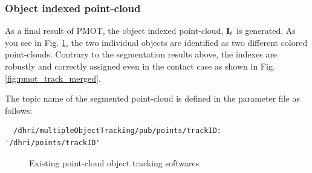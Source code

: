 \documentclass[a4paper,twoside, openright,12pt]{report}
\begin{document}
\subsubsection{Object indexed point-cloud}
As a final result of PMOT, the object indexed point-cloud, ${\bf{I}}_t$ is generated. As you see in Fig. \ref{fig:pmot_track}, the two individual objects are identified as two different colored point-clouds. Contrary to the segmentation results above, the indexes are robustly and correctly assigned even in the contact case as shown in Fig. \ref{fig:pmot_track_merged}.

The topic name of the segmented point-cloud is defined in the parameter file as follows: 
\begin{verbatim}
  /dhri/multipleObjectTracking/pub/points/trackID: '/dhri/points/trackID'
\end{verbatim}

\begin{figure}[t]
	\centering
	\hfil
	\caption{Existing point-cloud object tracking softwares}
	\label{fig:pmot_track}
\end{figure}

\cleardoublepage
{} 
\listoffigures 	 %

\end{document}
